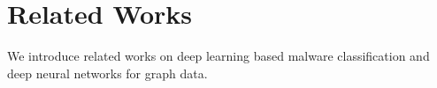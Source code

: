 \section{Related Works} \label{sec:related-work}
We introduce related works on deep learning based malware classification and deep neural networks for graph data.



